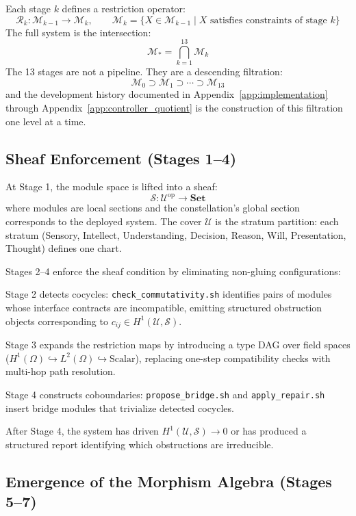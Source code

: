 \documentclass[12pt, oneside]{article}
\begin{document}
Each stage $k$ defines a restriction operator:
\[
\mathcal{R}_k : \mathcal{M}_{k-1} \to \mathcal{M}_k, \qquad
\mathcal{M}_k = \{ X \in \mathcal{M}_{k-1} \mid X \text{ satisfies constraints of stage } k \}
\]
The full system is the intersection:
\[
\mathcal{M}_* = \bigcap_{k=1}^{13} \mathcal{M}_k
\]
The 13 stages are not a pipeline. They are a descending filtration:
\[
\mathcal{M}_0 \supset \mathcal{M}_1 \supset \cdots \supset \mathcal{M}_{13}
\]
and the development history documented in Appendix~\ref{app:implementation} through
Appendix~\ref{app:controller_quotient} is the construction of this filtration one level
at a time.

\subsection{Sheaf Enforcement (Stages 1--4)}

At Stage 1, the module space is lifted into a sheaf:
\[
\mathcal{S} : \mathcal{U}^{\mathrm{op}} \to \mathbf{Set}
\]
where modules are local sections and the constellation's global section corresponds to
the deployed system. The cover $\mathcal{U}$ is the stratum partition: each stratum
(Sensory, Intellect, Understanding, Decision, Reason, Will, Presentation, Thought)
defines one chart.

Stages 2--4 enforce the sheaf condition by eliminating non-gluing configurations:

Stage 2 detects cocycles: \texttt{check\_commutativity.sh} identifies pairs of modules
whose interface contracts are incompatible, emitting structured obstruction objects
corresponding to $c_{ij} \in H^1(\mathcal{U}, \mathcal{S})$.

Stage 3 expands the restriction maps by introducing a type DAG over field spaces
($H^1(\Omega) \hookrightarrow L^2(\Omega) \hookrightarrow \mathrm{Scalar}$),
replacing one-step compatibility checks with multi-hop path resolution.

Stage 4 constructs coboundaries: \texttt{propose\_bridge.sh} and
\texttt{apply\_repair.sh} insert bridge modules that trivialize detected cocycles.

After Stage 4, the system has driven $H^1(\mathcal{U}, \mathcal{S}) \to 0$ or has
produced a structured report identifying which obstructions are irreducible.

\subsection{Emergence of the Morphism Algebra (Stages 5--7)}
\end{document}
